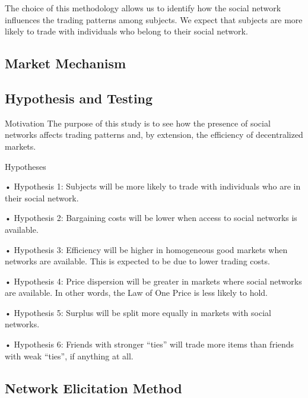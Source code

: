 \documentclass{article}
\begin{document}
The choice of this methodology allows us to identify how the social network influences the trading patterns among subjects. We expect that subjects are more likely to trade with individuals who belong to their social network. 

\subsection{Market Mechanism}


\subsection{Hypothesis and Testing}
Motivation
The purpose of this study is to see how the presence of social networks affects trading patterns and, by extension, the efficiency of decentralized markets.

Hypotheses

• Hypothesis 1: Subjects will be more likely to trade with individuals who are in their social network. 

• Hypothesis 2: Bargaining costs will be lower when access to social networks is available. 

• Hypothesis 3: Efficiency will be higher in homogeneous good markets when networks are available. This is expected to be due to lower trading costs.  

• Hypothesis 4: Price dispersion will be greater in markets where social networks are available. In other words, the Law of One Price is less likely to hold. 

• Hypothesis 5: Surplus will be split more equally in markets with social networks.

• Hypothesis 6: Friends with stronger “ties” will trade more items than friends with weak “ties”, if anything at all.



\subsection{Network Elicitation Method}





\end{document}
